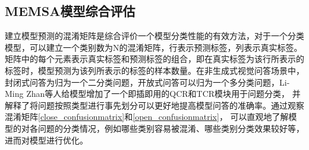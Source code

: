 \subsection{MEMSA模型综合评估}
建立模型预测的混淆矩阵是综合评价一个模型分类性能的有效方法，对于一个分类模型，可以建立一个类别数为N的混淆矩阵，行表示预测标签，列表示真实标签。
矩阵中的每个元素表示真实标签和预测标签的组合，即在真实标签为该行所表示的标签时，模型预测为该列所表示的标签的样本数量。在非生成式视觉问答场景中，
封闭式问答为归为一个二分类问题，开放式问答可以归为一个多分类问题，Li-Ming Zhan等人给模型增加了一个即插即用的QCR和TCR模块\cite{zhan2020medical}用于问题分类，
并解释了将问题按照类型进行事先划分可以更好地提高模型问答的准确率。通过观察混淆矩阵\ref{close_confusionmatrix}和\ref{open_confusionmatrix}，
可以直观地了解模型的对各问题的分类情况，例如哪些类别容易被混淆、哪些类别分类效果较好等，进而对模型进行优化。


